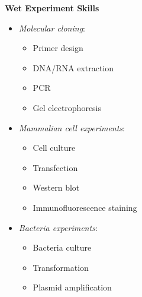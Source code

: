 \textbf{Wet Experiment Skills}
\vspace{-1em}
\begin{multicols}{3}
\begin{itemize}
    \item \textit{Molecular cloning}:
    \begin{itemize}
        \item Primer design
        \item DNA/RNA extraction
        \item PCR
        \item Gel electrophoresis
    \end{itemize}
\end{itemize}  
  
\columnbreak %

\begin{minipage}[t]{0.35\textwidth} %
    \begin{itemize} 
        \item \textit{Mammalian cell experiments}:
        \begin{itemize}
            \item Cell culture
            \item Transfection
            \item Western blot
            \item Immunofluorescence staining
        \end{itemize}
    \end{itemize}
\end{minipage}  


\columnbreak %
  
\begin{itemize} 
    \item \textit{Bacteria experiments}:
    \begin{itemize}
        \item Bacteria culture
        \item Transformation
        \item Plasmid amplification
    \end{itemize}
\end{itemize}  
\end{multicols}
\vspace{-1em}